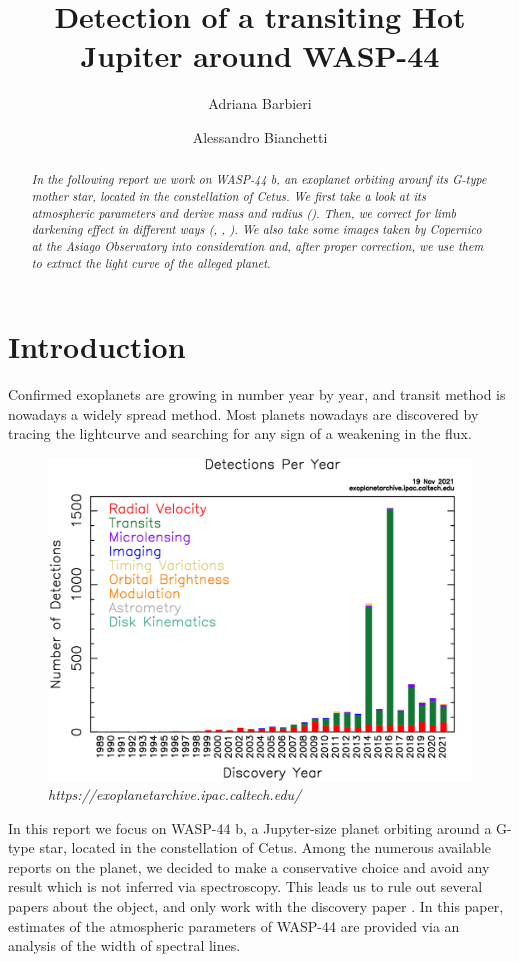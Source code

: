 \documentclass[a4paper,11pt,twocolumn]{article}
\title{Detection of a transiting Hot Jupiter around WASP-44}
\author{Adriana Barbieri \and Alessandro Bianchetti}
\begin{document}
\maketitle

\begin{abstract}

\emph{In the following report we work on WASP-44 b, an exoplanet orbiting 
arounf its G-type mother star, located in the constellation of Cetus. 
We first take a look at its atmospheric parameters and derive mass and 
radius (\cite{Morton}). Then, we correct for limb darkening effect in different ways 
(\cite{claret2011}, \cite{claret2017}, \cite{claret2018}). We also take 
some images taken by Copernico at the Asiago Observatory into consideration 
and, after proper correction, we use them to extract the light curve of 
the alleged planet.}

\end{abstract}

\section{Introduction}

Confirmed exoplanets are growing in number year by year, and transit method 
is nowadays a widely spread method. Most planets nowadays are discovered 
by tracing the lightcurve and searching for any sign of a weakening in the 
flux.
\begin{figure}[H]
    \centering  
    \includegraphics[scale=0.15, angle=0]{../pictures/exo_dischist.png}
    \caption*{\textit{ https://exoplanetarchive.ipac.caltech.edu/}}
\end{figure}
In this report we focus on WASP-44 b, a Jupyter-size planet orbiting around 
a G-type star, located in the constellation of Cetus.
Among the numerous available reports on the planet, we decided to make a 
conservative choice and avoid any result which is not inferred via 
spectroscopy. This leads us to rule out several papers about the object, and 
only work with the discovery paper \cite*{Anderson}. In this paper, estimates 
of the atmospheric parameters of WASP-44 are provided via an analysis of 
the width of spectral lines.
\end{document}

